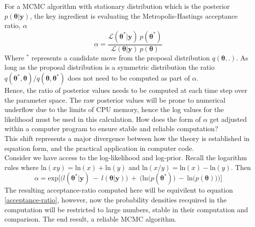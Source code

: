 \begin{tcolorbox}[enhanced jigsaw,breakable,pad at break*=1mm,title=Technical figure 3: Stable computation of likelihood values, title filled,fonttitle=\sffamily\bfseries,fontupper=\sffamily\scriptsize]
\begin{multicols}{2}
For a MCMC algorithm with stationary distribution which is the posterior $p(\bm{\theta}|\bm{y})$, the key ingredient is evaluating the Metropolis-Hastings acceptance ratio, $\alpha$
\begin{equation}
\alpha = \frac{\mathcal{L}(\bm{\theta^*}|\bm{y})\ p(\bm{\theta^*})}{\mathcal{L}(\bm{\theta}|\bm{y})\ p(\bm{\theta})}
\label{acceptance-ratio}
\end{equation}
Where $^*$ represents a candidate move from the proposal distribution $q(\bm{\theta},.)$. As long as the proposal distribution is a symmetric distribution the ratio $q(\bm{\theta^*},\bm{\theta})/q(\bm{\theta},\bm{\theta^*})$ does not need to be computed as part of $\alpha$.\\

Hence, the ratio of posterior values needs to be computed at each time step over the parameter space. The raw posterior values will be prone to numerical underflow due to the limits of CPU memory, hence the log values for the likelihood must be used in this calculation. How does the form of $\alpha$ get adjusted within a computer program to ensure stable and reliable computation?\\

This shift represents a major divergence between how the theory is established in equation form, and the practical application in computer code.\\

Consider we have access to the log-likelihood and log-prior. Recall the logarithm rules where $\text{ln}(xy) = \text{ln}(x)+\text{ln}(y)$ and $\text{ln}(x/y) = \text{ln}(x)-\text{ln}(y)$. Then
\begin{equation}
\alpha = \text{exp}\Big[\Big(l(\bm{\theta^*}|\bm{y})\ -\ l(\bm{\theta}|\bm{y})\Big)\ +\ \Big(\text{ln}\big(p(\bm{\theta^*})\big)\ -\ \text{ln}\big(p(\bm{\theta})\big)\Big)\Big]
\label{stable-acceptance-ratio}
\end{equation}
The resulting acceptance-ratio computed here will be equivilent to equation \ref{acceptance-ratio}, however, now the probability densities recquired in the computation will be restricted to large numbers, stable in their computation and comparison. The end result, a reliable MCMC algorithm.\\
\end{multicols}
\end{tcolorbox}

